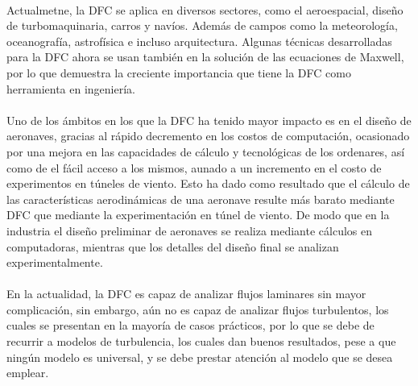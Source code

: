\documentclass[letterpaper, openright, 12pt]{book}
\begin{document}
            \paragraph*{}
                Actualmetne, la DFC se aplica en diversos sectores, como el
                aeroespacial, diseño de turbomaquinaria, carros y navíos. Además
                de campos como la meteorología, oceanografía, astrofísica e
                incluso arquitectura. Algunas técnicas desarrolladas para la DFC
                ahora se usan también en la solución de las ecuaciones de
                Maxwell, por lo que demuestra la creciente importancia que tiene
                la DFC como herramienta en ingeniería.\cite{blazek}

            \paragraph*{}
                Uno de los ámbitos en los que la DFC ha tenido mayor impacto es
                en el diseño de aeronaves, gracias al rápido decremento en los
                costos de computación, ocasionado por una mejora en las
                capacidades de cálculo y tecnológicas de los ordenares, así como
                de el fácil acceso a los mismos, aunado a un incremento en el
                costo de experimentos en túneles de viento. Esto ha dado como
                resultado que el cálculo de las características aerodinámicas de
                una aeronave resulte más barato mediante DFC que mediante la
                experimentación en túnel de viento. De modo que en la industria
                el diseño preliminar de aeronaves se realiza mediante cálculos
                en computadoras, mientras que los detalles del diseño final se
                analizan experimentalmente.\cite{anderson-yotros}

            \paragraph*{}
                En la actualidad, la DFC es capaz de analizar flujos laminares
                sin mayor complicación, sin embargo, aún no es capaz de analizar
                flujos turbulentos, los cuales se presentan en la mayoría de
                casos prácticos,  por lo que se debe de recurrir a modelos de
                turbulencia, los cuales dan buenos resultados, pese a que ningún
                modelo es universal, y se debe prestar atención al modelo que se
                desea emplear.\cite{cengel}
\end{document}
